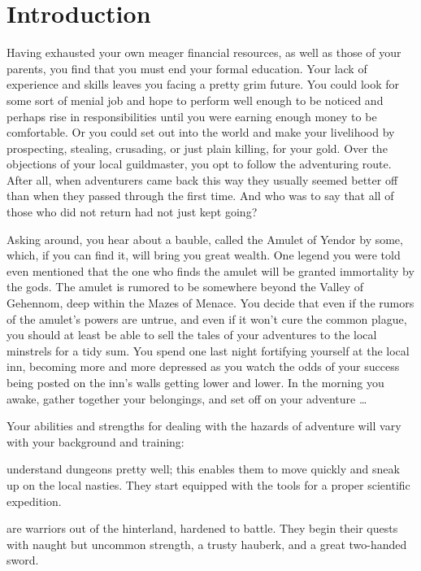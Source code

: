 \section{Introduction}


Having exhausted your own meager financial resources, as well as those of
your parents, you find that you must end your formal education.  Your lack of
experience and skills leaves you facing a pretty grim future.  You could look
for some sort of menial job and hope to perform well enough to be noticed and
perhaps rise in responsibilities until you were earning enough money to be
comfortable.  Or you could set out into the world and make your livelihood by
prospecting, stealing, crusading, or just plain killing, for your gold.
Over the objections of your local guildmaster, you opt to follow the
adventuring route.  After all, when adventurers came back this way they
usually seemed better off than when they passed through the first time.  And
who was to say that all of those who did not return had not just kept going?

Asking around, you hear about a bauble, called the Amulet of Yendor by some,
which, if you can find it, will bring you great wealth.  One legend you were
told even mentioned that the one who finds the amulet will be granted
immortality by the gods.  The amulet is rumored to be somewhere beyond the
Valley of Gehennom, deep within the Mazes of Menace.  You decide that even if
the rumors of the amulet's powers are untrue, and even if it won't cure the
common plague, you should at least be able to sell the tales of your
adventures to the local minstrels for a tidy sum.  You spend one last night
fortifying yourself at the local inn, becoming more and more depressed as you
watch the odds of your success being posted on the inn's walls getting lower
and lower.  In the morning you awake, gather together your belongings, and
set off on your adventure \ldots

Your abilities and strengths for dealing with the hazards of adventure
will vary with your background and training:
\blist{}

\item[\bb{Archeologists}]%
understand dungeons pretty well; this enables them
to move quickly and sneak up on the local nasties.  They start equipped
with the tools for a proper scientific expedition.

\item[\bb{Barbarians}]%
are warriors out of the hinterland, hardened to battle.
They begin their quests with naught but uncommon strength, a trusty hauberk,
and a great two-handed sword.

